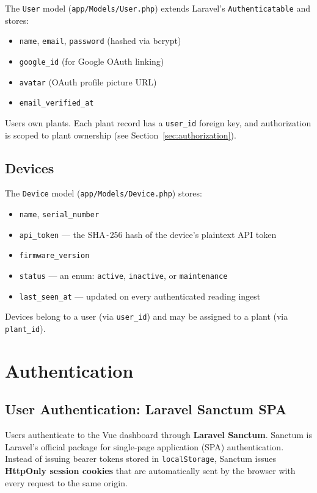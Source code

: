 \documentclass[11pt,a4paper]{article}
\begin{document}
The \texttt{User} model (\texttt{app/Models/User.php}) extends Laravel's \texttt{Authenticatable} and stores:
\begin{itemize}
    \item \texttt{name}, \texttt{email}, \texttt{password} (hashed via bcrypt)
    \item \texttt{google\_id} (for Google OAuth linking)
    \item \texttt{avatar} (OAuth profile picture URL)
    \item \texttt{email\_verified\_at}
\end{itemize}

Users own plants. Each plant record has a \texttt{user\_id} foreign key, and authorization is scoped to plant ownership (see Section~\ref{sec:authorization}).

\subsection{Devices}

The \texttt{Device} model (\texttt{app/Models/Device.php}) stores:
\begin{itemize}
    \item \texttt{name}, \texttt{serial\_number}
    \item \texttt{api\_token} --- the SHA\texttt{-}256 hash of the device's plaintext API token
    \item \texttt{firmware\_version}
    \item \texttt{status} --- an enum: \texttt{active}, \texttt{inactive}, or \texttt{maintenance}
    \item \texttt{last\_seen\_at} --- updated on every authenticated reading ingest
\end{itemize}

Devices belong to a user (via \texttt{user\_id}) and may be assigned to a plant (via \texttt{plant\_id}).

\section{Authentication}

\subsection{User Authentication: Laravel Sanctum SPA}

Users authenticate to the Vue dashboard through \textbf{Laravel Sanctum}. Sanctum is Laravel's official package for single-page application (SPA) authentication. Instead of issuing bearer tokens stored in \texttt{localStorage}, Sanctum issues \textbf{HttpOnly session cookies} that are automatically sent by the browser with every request to the same origin.
\end{document}
